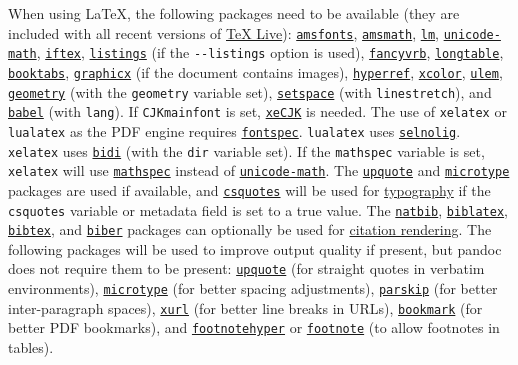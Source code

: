 When using LaTeX, the following packages need to be available (they are
included with all recent versions of
\href{https://www.tug.org/texlive/}{TeX Live}):
\href{https://ctan.org/pkg/amsfonts}{\texttt{amsfonts}},
\href{https://ctan.org/pkg/amsmath}{\texttt{amsmath}},
\href{https://ctan.org/pkg/lm}{\texttt{lm}},
\href{https://ctan.org/pkg/unicode-math}{\texttt{unicode-math}},
\href{https://ctan.org/pkg/iftex}{\texttt{iftex}},
\href{https://ctan.org/pkg/listings}{\texttt{listings}} (if the
\texttt{-\/-listings} option is used),
\href{https://ctan.org/pkg/fancyvrb}{\texttt{fancyvrb}},
\href{https://ctan.org/pkg/longtable}{\texttt{longtable}},
\href{https://ctan.org/pkg/booktabs}{\texttt{booktabs}},
\href{https://ctan.org/pkg/graphicx}{\texttt{graphicx}} (if the document
contains images),
\href{https://ctan.org/pkg/hyperref}{\texttt{hyperref}},
\href{https://ctan.org/pkg/xcolor}{\texttt{xcolor}},
\href{https://ctan.org/pkg/ulem}{\texttt{ulem}},
\href{https://ctan.org/pkg/geometry}{\texttt{geometry}} (with the
\texttt{geometry} variable set),
\href{https://ctan.org/pkg/setspace}{\texttt{setspace}} (with
\texttt{linestretch}), and
\href{https://ctan.org/pkg/babel}{\texttt{babel}} (with \texttt{lang}).
If \texttt{CJKmainfont} is set,
\href{https://ctan.org/pkg/xecjk}{\texttt{xeCJK}} is needed. The use of
\texttt{xelatex} or \texttt{lualatex} as the PDF engine requires
\href{https://ctan.org/pkg/fontspec}{\texttt{fontspec}}.
\texttt{lualatex} uses
\href{https://ctan.org/pkg/selnolig}{\texttt{selnolig}}.
\texttt{xelatex} uses \href{https://ctan.org/pkg/bidi}{\texttt{bidi}}
(with the \texttt{dir} variable set). If the \texttt{mathspec} variable
is set, \texttt{xelatex} will use
\href{https://ctan.org/pkg/mathspec}{\texttt{mathspec}} instead of
\href{https://ctan.org/pkg/unicode-math}{\texttt{unicode-math}}. The
\href{https://ctan.org/pkg/upquote}{\texttt{upquote}} and
\href{https://ctan.org/pkg/microtype}{\texttt{microtype}} packages are
used if available, and
\href{https://ctan.org/pkg/csquotes}{\texttt{csquotes}} will be used for
\protect\hyperlink{typography}{typography} if the \texttt{csquotes}
variable or metadata field is set to a true value. The
\href{https://ctan.org/pkg/natbib}{\texttt{natbib}},
\href{https://ctan.org/pkg/biblatex}{\texttt{biblatex}},
\href{https://ctan.org/pkg/bibtex}{\texttt{bibtex}}, and
\href{https://ctan.org/pkg/biber}{\texttt{biber}} packages can
optionally be used for \protect\hyperlink{citation-rendering-1}{citation
rendering}. The following packages will be used to improve output
quality if present, but pandoc does not require them to be present:
\href{https://ctan.org/pkg/upquote}{\texttt{upquote}} (for straight
quotes in verbatim environments),
\href{https://ctan.org/pkg/microtype}{\texttt{microtype}} (for better
spacing adjustments),
\href{https://ctan.org/pkg/parskip}{\texttt{parskip}} (for better
inter-paragraph spaces), \href{https://ctan.org/pkg/xurl}{\texttt{xurl}}
(for better line breaks in URLs),
\href{https://ctan.org/pkg/bookmark}{\texttt{bookmark}} (for better PDF
bookmarks), and
\href{https://ctan.org/pkg/footnotehyper}{\texttt{footnotehyper}} or
\href{https://ctan.org/pkg/footnote}{\texttt{footnote}} (to allow
footnotes in tables).

